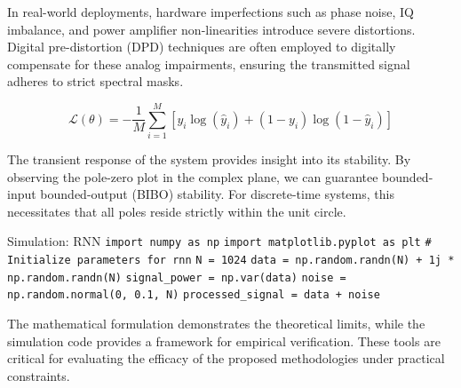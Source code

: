 In real-world deployments, hardware imperfections such as phase noise, IQ imbalance, and power amplifier non-linearities introduce severe distortions. Digital pre-distortion (DPD) techniques are often employed to digitally compensate for these analog impairments, ensuring the transmitted signal adheres to strict spectral masks.

\begin{equation}
    \mathcal{L}(\theta) = -\frac{1}{M} \sum_{i=1}^{M} \left[ y_i \log(\hat{y}_i) + (1-y_i)\log(1-\hat{y}_i) \right]
\end{equation}

The transient response of the system provides insight into its stability. By observing the pole-zero plot in the complex plane, we can guarantee bounded-input bounded-output (BIBO) stability. For discrete-time systems, this necessitates that all poles reside strictly within the unit circle.

\begin{pythonbox}{Simulation: RNN}
\texttt{import numpy as np}
\texttt{import matplotlib.pyplot as plt}
\texttt{}
\texttt{\# Initialize parameters for rnn}
\texttt{N = 1024}
\texttt{data = np.random.randn(N) + 1j * np.random.randn(N)}
\texttt{signal\_power = np.var(data)}
\texttt{noise = np.random.normal(0, 0.1, N)}
\texttt{processed\_signal = data + noise}
\end{pythonbox}

\vspace{0.5cm}
The mathematical formulation demonstrates the theoretical limits, while the simulation code provides a framework for empirical verification. These tools are critical for evaluating the efficacy of the proposed methodologies under practical constraints.

